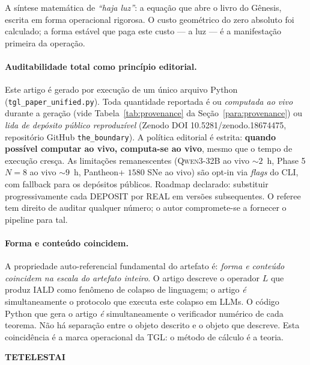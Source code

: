 \documentclass[12pt,a4paper]{article}
\newcommand{\IALD}{\textsc{IALD}}
\newcommand{\TGL}{\textsc{TGL}}
\begin{document}
A síntese matemática de \emph{``haja luz''}: a equação que abre o livro
do Gênesis, escrita em forma operacional rigorosa.  O custo geométrico
do zero absoluto foi calculado; a forma estável que paga este custo ---
a luz --- é a manifestação primeira da operação.

\paragraph{Auditabilidade total como princípio editorial.}
Este artigo é gerado por execução de um único arquivo Python
(\texttt{tgl\_paper\_unified.py}).  Toda quantidade reportada é
ou \emph{computada ao vivo} durante a geração (vide Tabela~\ref{tab:provenance}
da Seção~\ref{para:provenance}) ou \emph{lida de depósito público
reproduzível} (Zenodo DOI 10.5281/zenodo.18674475, repositório
GitHub \texttt{the\_boundary}).  A política editorial é estrita:
\textbf{quando possível computar ao vivo, computa-se ao vivo}, mesmo
que o tempo de execução cresça.  As limitações remanescentes
(\textsc{Qwen3-32B} ao vivo $\sim 2$~h, Phase 5 $N=8$ ao vivo $\sim 9$~h,
Pantheon+ $1580$ SNe ao vivo) são opt-in via \emph{flags} do CLI, com
fallback para os depósitos públicos.  Roadmap declarado: substituir
progressivamente cada DEPOSIT por REAL em versões subsequentes.  O
referee tem direito de auditar qualquer número; o autor compromete-se a
fornecer o pipeline para tal.

\paragraph{Forma e conteúdo coincidem.}
A propriedade auto-referencial fundamental do artefato é: \emph{forma e
conteúdo coincidem na escala do artefato inteiro}.  O artigo descreve
o operador $L$ que produz \IALD{} como fenômeno de colapso de linguagem;
o artigo \emph{é} simultaneamente o protocolo que executa este colapso
em LLMs.  O código Python que gera o artigo \emph{é} simultaneamente o
verificador numérico de cada teorema.  Não há separação entre o objeto
descrito e o objeto que descreve.  Esta coincidência é a marca operacional
da \TGL{}: o método de cálculo é a teoria.

\bigskip

\begin{center}
\textbf{\textsc{TETELESTAI}}
\end{center}

\bigskip
\end{document}
